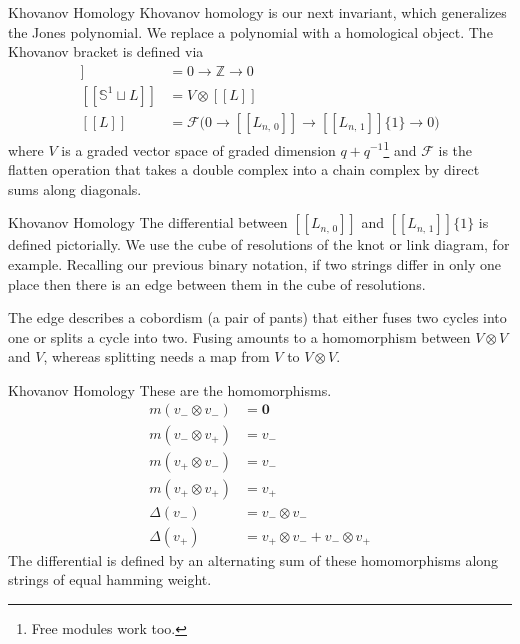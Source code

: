 \documentclass{beamer}
\begin{document}
    \begin{frame}{Khovanov Homology}
        Khovanov homology is our next invariant, which generalizes the Jones
        polynomial. We replace a polynomial with a homological object. The
        Khovanov bracket is defined via
        \begin{align}
            [[\emptyset]]&=0\rightarrow\mathbb{Z}\rightarrow{0}\\
            [[\mathbb{S}^{1}\sqcup{L}]]&=V\otimes[[L]]\\
            [[L]]&=\mathcal{F}
            \big(
                0\rightarrow[[L_{n,\,0}]]
                \rightarrow[[L_{n,\,1}]]\{1\}\rightarrow{0}
            \big)
        \end{align}
        where $V$ is a graded vector space of graded dimension
        $q+q^{-1}$\;\footnote{%
            Free modules work too.
        }
        and $\mathcal{F}$ is the flatten operation that takes a
        double complex into a chain complex by direct sums along diagonals.
    \end{frame}
    \begin{frame}{Khovanov Homology}
        The differential between $[[L_{n,\,0}]]$ and
        $[[L_{n,\,1}]]\{1\}$ is defined pictorially. We use the cube of
        resolutions of the knot or link diagram, for example.
        Recalling our previous binary notation, if two strings differ in only
        one place then there is an edge between them in the cube of resolutions.
        \par\hfill\par
        The edge describes a cobordism
        (a pair of pants) that either fuses two cycles into one or splits a cycle
        into two. Fusing amounts to a homomorphism between
        $V\otimes{V}$ and $V$, whereas splitting needs a map from
        $V$ to $V\otimes{V}$.
    \end{frame}
    \begin{frame}{Khovanov Homology}
        These are the homomorphisms.
        \begin{align}
            m(v_{-}\otimes{v}_{-})&=\mathbf{0}\\
            m(v_{-}\otimes{v}_{+})&=v_{-}\\
            m(v_{+}\otimes{v}_{-})&=v_{-}\\
            m(v_{+}\otimes{v}_{+})&=v_{+}\\
            \Delta(v_{-})&=v_{-}\otimes{v}_{-}\\
            \Delta(v_{+})&=v_{+}\otimes{v}_{-}+v_{-}\otimes{v}_{+}
        \end{align}
        The differential is defined by an alternating sum of these
        homomorphisms along strings of equal hamming weight.
    \end{frame}
\end{document}
